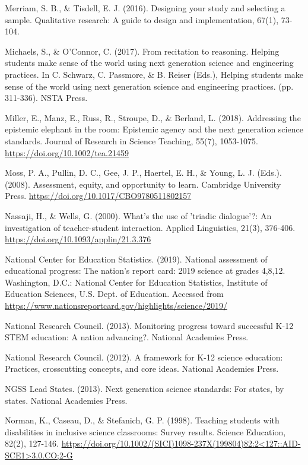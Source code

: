 \documentclass{sig-alternate} %
\begin{document}
Merriam, S. B., \& Tisdell, E. J. (2016). Designing your study and selecting a sample. Qualitative research: A guide to design and implementation, 67(1), 73-104.

Michaels, S., \& O’Connor, C. (2017). From recitation to reasoning. Helping students make sense of the world using next generation science and engineering practices. In C. Schwarz, C. Passmore, \& B. Reiser (Eds.), Helping students make sense of the world using next generation science and engineering practices. (pp. 311-336). NSTA Press.

Miller, E., Manz, E., Russ, R., Stroupe, D., \& Berland, L. (2018). Addressing the epistemic elephant in the room: Epistemic agency and the next generation science standards. Journal of Research in Science Teaching, 55(7), 1053-1075. \url{https://doi.org/10.1002/tea.21459}

Moss, P. A., Pullin, D. C., Gee, J. P., Haertel, E. H., \& Young, L. J. (Eds.). (2008). Assessment, equity, and opportunity to learn. Cambridge University Press. \url{https://doi.org/10.1017/CBO9780511802157}

Nassaji, H., \& Wells, G. (2000). What's the use of 'triadic dialogue'?: An investigation of teacher-student interaction. Applied Linguistics, 21(3), 376-406. \url{https://doi.org/10.1093/applin/21.3.376}

National Center for Education Statistics. (2019). National assessment of educational progress: The nation’s report card: 2019 science at grades 4,8,12. Washington, D.C.: National Center for Education Statistics, Institute of Education Sciences, U.S. Dept. of Education. Accessed from \url{https://www.nationsreportcard.gov/highlights/science/2019/}

National Research Council. (2013). Monitoring progress toward successful K-12 STEM education: A nation advancing?. National Academies Press.

National Research Council. (2012). A framework for K-12 science education: Practices, crosscutting concepts, and core ideas. National Academies Press.

NGSS Lead States. (2013). Next generation science standards: For states, by states. National Academies Press.

Norman, K., Caseau, D., \& Stefanich, G. P. (1998). Teaching students with disabilities in inclusive science classrooms: Survey results. Science Education, 82(2), 127-146. \url{https://doi.org/10.1002/(SICI)1098-237X(199804)82:2<127::AID-SCE1>3.0.CO;2-G}
\end{document}
